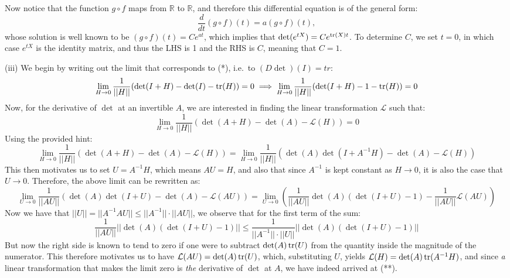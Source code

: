 \begin{solution}
    Now notice that the function $g \circ f$ maps from $\mathbb{R}$ to $\mathbb{R}$, and therefore this differential equation is of the general form:
    $$\frac{d}{dt} (g \circ f)(t) = a (g \circ f)(t),$$
    whose solution is well known to be $(g \circ f)(t) = Ce^{at}$, which implies that $\det(e^{tX}) = Ce^{\operatorname{tr}(X) t}$. 
    To determine $C$, we set $t = 0$, in which case $e^{tX}$ is the identity matrix, and thus the LHS is 1 and the RHS is $C$, meaning that $C = 1$.

    (iii) We begin by writing out the limit that corresponds to (*), i.e.\ to $(D \det)(I) = tr$:
    $$\lim_{H \rightarrow 0}\frac{1}{\lvert \lvert H \rvert \rvert}( \det(I + H) - \det(I) - \operatorname{tr}(H)) = 0 \implies \lim_{H \rightarrow 0}\frac{1}{\lvert \lvert H \rvert \rvert}(\det(I+H) - 1 -\operatorname{tr}(H)) = 0$$
    Now, for the derivative of $\det$ at an invertible $A$, we are interested in finding the linear transformation $\mathcal{L}$ such that:
    $$\lim_{H \rightarrow 0}\frac{1}{\lvert \lvert H \rvert \rvert}(\det(A + H) - \det(A) - \mathcal{L}(H)) = 0$$
    Using the provided hint:
    $$\lim_{H \rightarrow 0}\frac{1}{\lvert \lvert H \rvert \rvert}(\det(A + H) - \det(A) - \mathcal{L}(H)) = \lim_{H \rightarrow 0}\frac{1}{\lvert \lvert H \rvert \rvert}(\det(A) \det(I + A^{-1}H) - \det(A) - \mathcal{L}(H))$$
    This then motivates us to set $U = A^{-1}H$, which means $AU = H$, and also that since $A^{-1}$ is kept constant as $H \rightarrow 0$, it is also the case that $U \rightarrow 0$. Therefore, the above limit can be rewritten as:
    $$\lim_{U \rightarrow 0}\frac{1}{\lvert \lvert A U \rvert \rvert}(\det(A) \det(I + U) - \det(A) - \mathcal{L}(AU)) = \lim_{U \rightarrow 0}(\frac{1}{\lvert \lvert AU \rvert \rvert}\det(A)(\det(I + U) - 1) - \frac{1}{\lvert \lvert AU \rvert \rvert}\mathcal{L}(AU))$$
    Now we have that $\lvert \lvert U \rvert \rvert = \lvert \lvert A^{-1}A U \rvert \rvert \leq \lvert \lvert A^{-1} \rvert \rvert \cdot \lvert \lvert A U \rvert \rvert$, we observe that for the first term of the sum:
    $$\frac{1}{\lvert \lvert AU \rvert \rvert}\lvert \lvert \det(A)(\det(I+U) - 1) \rvert \rvert \leq \frac{1}{\lvert \lvert A^{-1} \rvert \rvert \cdot \lvert \lvert U \rvert \rvert}\lvert \lvert \det(A)(\det(I+U) - 1) \rvert \rvert $$
    But now the right side is known to tend to zero if one were to subtract $\det(A) \operatorname{tr}(U)$ from the quantity inside the magnitude of the numerator.
    This therefore motivates us to have $\mathcal{L}(AU) = \det(A) \operatorname{tr}(U)$, which, substituting $U$, yields $\mathcal{L}(H) = \det(A) \operatorname{tr}(A^{-1}H)$, and since \textit{a} linear transformation that makes the limit zero is \textit{the} derivative of $\det$ at $A$, we have indeed arrived at (**).


\end{solution}
